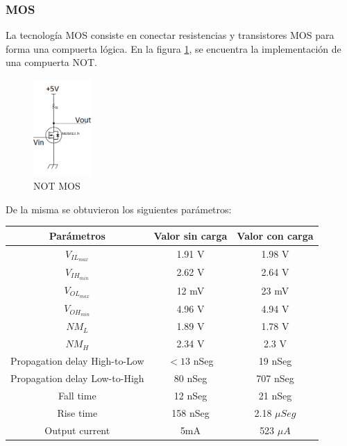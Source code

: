 \subsubsection{MOS}
La tecnología MOS consiste en conectar resistencias y transistores MOS para forma una compuerta lógica. En la figura \ref{fig:eje1_3}, se encuentra la implementación de una compuerta NOT.
\begin{figure}[H]
	\centering
	\includegraphics[width=0.2\textwidth]{Ejercicio1/MOS.png}
	\caption{NOT MOS}
	\label{fig:eje1_3}
\end{figure}
De la misma se obtuvieron los siguientes parámetros:
\begin{table}[H]
	\centering
	\begin{tabular}{|c|c|c|}
		\hline
		Parámetros & Valor sin carga & Valor con carga\\
		\hline
		$V_{IL_{max}}$ & 1.91 V & 1.98 V\\
		\hline
		$V_{IH_{min}}$ & 2.62 V & 2.64 V\\
		\hline
		$V_{OL_{max}}$ & 12 mV & 23 mV\\
		\hline
		$V_{OH_{min}}$ & 4.96 V & 4.94 V\\
		\hline
		$NM_{L}$ & 1.89 V & 1.78 V\\
		\hline
		$NM_{H}$ & 2.34 V & 2.3 V\\
		\hline
		Propagation delay High-to-Low & $<13$ nSeg & 19 nSeg\\
		\hline
		Propagation delay Low-to-High & 80 nSeg & 707 nSeg\\
		\hline
		Fall time & 12 nSeg & 21 nSeg\\
		\hline
		Rise time & 158 nSeg & 2.18 $\mu Seg$\\
		\hline
		Output current & 5mA & 523 $\mu A$\\
		\hline
	\end{tabular}
\end{table}

